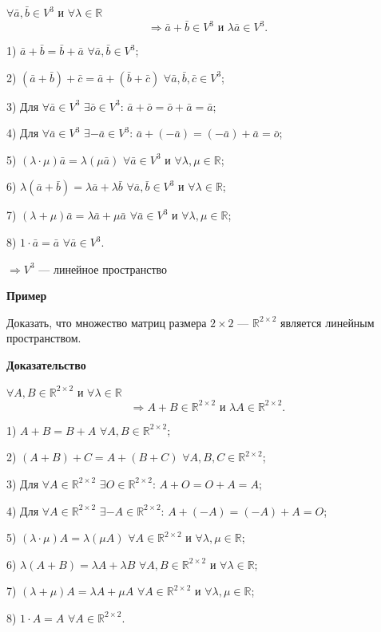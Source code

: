 \documentclass[12pt,a4paper]{article}
\newcommand{\va}{\bar a}
\newcommand{\vb}{\bar b}
\newcommand{\vc}{\bar c}
\newcommand{\vo}{\bar o}
\begin{document}
$\forall\va,\vb\in V^3$ и $\forall\lambda\in\mathbb R$
$$
\Rightarrow \va+\vb\in V^3 \text{ и } \lambda\va\in V^3.
$$

1) $\va+\vb=\vb+\va$ $\forall\va,\vb\in V^3$;

2) $(\va+\vb)+\vc=\va+(\vb+\vc)$ $\forall\va,\vb,\vc\in V^3$;

3) Для $\forall\va\in V^3$ $\exists\vo\in V^3$: $\va+\vo=\vo+\va=\va$;

4) Для $\forall\va\in V^3$ $\exists-\va\in V^3$: $\va+(-\va)=(-\va)+\va=\vo$;

5) $(\lambda\cdot\mu)\va=\lambda(\mu\va)$ $\forall\va\in V^3$ и
$\forall\lambda,\mu\in\mathbb R$;

6) $\lambda(\va+\vb)=\lambda\va+\lambda\vb$ $\forall\va,\vb\in V^3$ и
$\forall\lambda\in\mathbb R$;

7) $(\lambda+\mu)\va=\lambda\va+\mu\va$ $\forall\va\in V^3$ и
$\forall\lambda,\mu\in\mathbb R$;

8) $1\cdot\va=\va$ $\forall\va\in V^3$.

$\Rightarrow V^3$ --- линейное пространство

\textbf{Пример}

Доказать, что множество матриц размера $2\times2$ --- $\mathbb
R^{2\times2}$ является линейным пространством.

\textbf{Доказательство}

$\forall A,B\in\mathbb R^{2\times2}$ и $\forall\lambda\in\mathbb R$
$$
\Rightarrow A+B\in\mathbb R^{2\times2} \text{ и } \lambda A\in\mathbb
R^{2\times2}.
$$

1) $A+B=B+A$ $\forall A,B\in\mathbb R^{2\times2}$;

2) $(A+B)+C=A+(B+C)$ $\forall A,B,C\in\mathbb R^{2\times2}$;

3) Для $\forall A\in\mathbb R^{2\times2}$ $\exists O\in\mathbb
R^{2\times2}$: $A+O=O+A=A$;

4) Для $\forall A\in\mathbb R^{2\times2}$ $\exists -A\in\mathbb
R^{2\times2}$: $A+(-A)=(-A)+A=O$;

5) $(\lambda\cdot\mu)A=\lambda(\mu A)$ $\forall A\in\mathbb
R^{2\times2}$ и $\forall\lambda,\mu\in\mathbb R$;

6) $\lambda(A+B)=\lambda A+\lambda B$ $\forall A,B\in\mathbb
R^{2\times2}$ и $\forall\lambda\in\mathbb R$;

7) $(\lambda+\mu)A=\lambda A+\mu A$ $\forall A\in\mathbb
R^{2\times2}$ и $\forall\lambda,\mu\in\mathbb R$;

8) $1\cdot A=A$ $\forall A\in\mathbb R^{2\times2}$.
\end{document}
